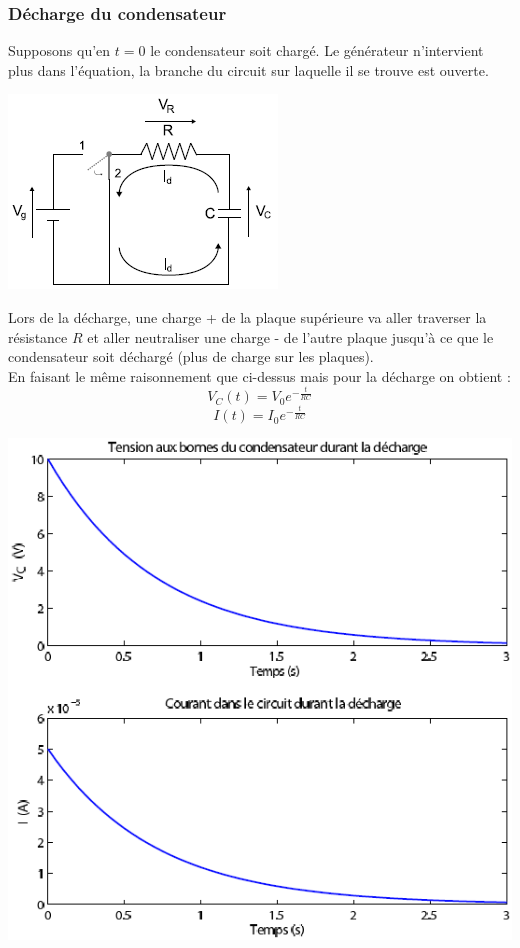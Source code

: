 \documentclass	[11pt, a4paper, openany]{book}
\begin{document}
		\subsubsection*{Décharge du condensateur}
		Supposons qu'en $t = 0$ le condensateur soit chargé. Le générateur n'intervient plus dans l'équation, la branche du circuit sur laquelle il se trouve est ouverte.
		\begin{center}
			\includegraphics[scale=0.5]{labo/image15.png}
		\end{center}
		Lors de la décharge, une charge + de la plaque supérieure va aller traverser la résistance $R$ et aller neutraliser une charge - de l'autre plaque jusqu'à ce que le condensateur soit déchargé (plus de charge sur les plaques).\\
		En faisant le même raisonnement que ci-dessus mais pour la décharge on obtient : 
		\begin{equation}
			V_C(t) = V_0e^{-\frac{t}{RC}}
		\end{equation}
		\begin{equation}
			I(t) = I_0e^{-\frac{t}{RC}}
		\end{equation}
		\begin{center}
			\includegraphics[scale=0.5]{labo/image16.png}
		\end{center}
		
\end{document}
